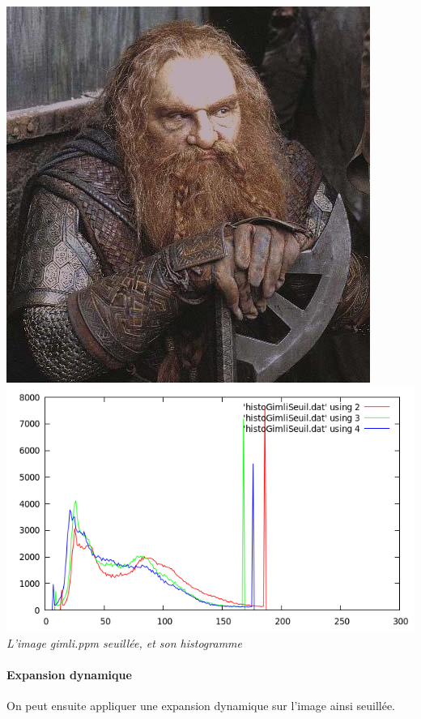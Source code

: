 \documentclass[a4paper,11pt]{article}
\begin{document}
\begin{center}
\includegraphics[scale=0.5]{gimliseuil.png}
\includegraphics[scale=0.5]{histoGimliSeuil.png}\\
\textit{L'image gimli.ppm seuillée, et son histogramme}
\end{center}

\newpage
\paragraph{Expansion dynamique} On peut ensuite appliquer une expansion dynamique sur l'image ainsi seuillée.
\end{document}
